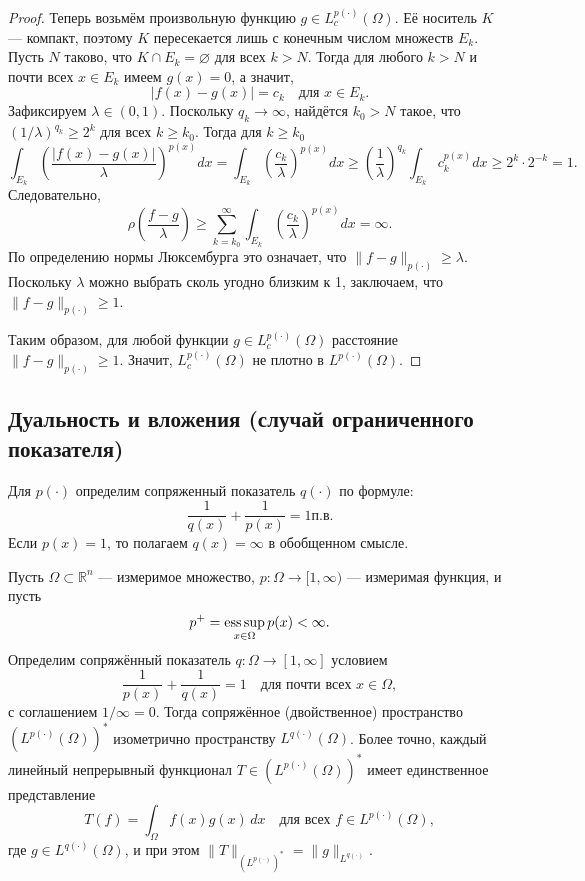 \documentclass[../NDCNNAI_main.tex]{subfiles}
\begin{document}
\begin{proof}
Теперь возьмём произвольную функцию \( g \in L_c^{p(\cdot)}(\Omega) \). Её носитель \( K \) --- компакт, поэтому \( K \) пересекается лишь с конечным числом множеств \( E_k \). Пусть \( N \) таково, что \( K \cap E_k = \varnothing \) для всех \( k > N \). Тогда для любого \( k > N \) и почти всех \( x \in E_k \) имеем \( g(x) = 0 \), а значит,
\[
|f(x) - g(x)| = c_k \quad \text{для } x \in E_k.
\]
Зафиксируем \( \lambda \in (0, 1) \). Поскольку \( q_k \to \infty \), найдётся \( k_0 > N \) такое, что \( (1/\lambda)^{q_k} \ge 2^k \) для всех \( k \ge k_0 \). Тогда для \( k \ge k_0 \)
\[
\int_{E_k} \left( \frac{|f(x)-g(x)|}{\lambda} \right)^{p(x)} dx
= \int_{E_k} \left( \frac{c_k}{\lambda} \right)^{p(x)} dx
\ge \left( \frac{1}{\lambda} \right)^{q_k} \int_{E_k} c_k^{p(x)} dx
\ge 2^k \cdot 2^{-k} = 1.
\]
Следовательно,
\[
\rho\left( \frac{f - g}{\lambda} \right) \ge \sum_{k=k_0}^\infty \int_{E_k} \left( \frac{c_k}{\lambda} \right)^{p(x)} dx = \infty.
\]
По определению нормы Люксембурга это означает, что \( \|f - g\|_{p(\cdot)} \ge \lambda \). Поскольку \( \lambda \) можно выбрать сколь угодно близким к 1, заключаем, что \( \|f - g\|_{p(\cdot)} \ge 1 \).

Таким образом, для любой функции \( g \in L_c^{p(\cdot)}(\Omega) \) расстояние \( \|f - g\|_{p(\cdot)} \ge 1 \). Значит, \( L_c^{p(\cdot)}(\Omega) \) не плотно в \( L^{p(\cdot)}(\Omega) \).
\end{proof}

\subsection{Дуальность и вложения (случай ограниченного показателя)}

\begin{definition}
Для \( p(\cdot) \) определим сопряженный показатель \( q(\cdot) \) по формуле:
\[
\frac{1}{q(x)} + \frac{1}{p(x)} = 1 \text{п.в.}
\]
Если \( p(x)=1 \), то полагаем \( q(x)=\infty \) в обобщенном смысле.
\end{definition}

\begin{theorem}
Пусть \( \Omega \subset \mathbb{R}^n \) --- измеримое множество, \( p \colon \Omega \to [1, \infty) \) --- измеримая функция, и пусть
\[
p^+ = \operatorname*{ess\,sup}_{x \in \Omega} p(x) < \infty.
\]
Определим сопряжённый показатель \( q \colon \Omega \to [1, \infty] \) условием
\[
\frac{1}{p(x)} + \frac{1}{q(x)} = 1 \quad \text{для почти всех } x \in \Omega,
\]
с соглашением \( 1/\infty = 0 \). Тогда сопряжённое (двойственное) пространство \( (L^{p(\cdot)}(\Omega))^* \) изометрично пространству \( L^{q(\cdot)}(\Omega) \). Более точно, каждый линейный непрерывный функционал \( T \in (L^{p(\cdot)}(\Omega))^* \) имеет единственное представление
\[
T(f) = \int_{\Omega} f(x)g(x) \, dx \quad \text{для всех } f \in L^{p(\cdot)}(\Omega),
\]
где \( g \in L^{q(\cdot)}(\Omega) \), и при этом $\|T\|_{(L^{p(\cdot)})^*} = \|g\|_{L^{q(\cdot)}}$.
\end{theorem}
\end{document}
